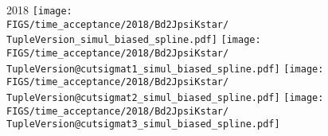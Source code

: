 \begin{frame}
  2018
  \texttt{[image: \\FIGS/time\_acceptance/2018/Bd2JpsiKstar/\\TupleVersion\_simul\_biased\_spline.pdf]}
  \texttt{[image: \\FIGS/time\_acceptance/2018/Bd2JpsiKstar/\\TupleVersion@cutsigmat1\_simul\_biased\_spline.pdf]}
  \texttt{[image: \\FIGS/time\_acceptance/2018/Bd2JpsiKstar/\\TupleVersion@cutsigmat2\_simul\_biased\_spline.pdf]}
  \texttt{[image: \\FIGS/time\_acceptance/2018/Bd2JpsiKstar/\\TupleVersion@cutsigmat3\_simul\_biased\_spline.pdf]}

\end{frame} %



